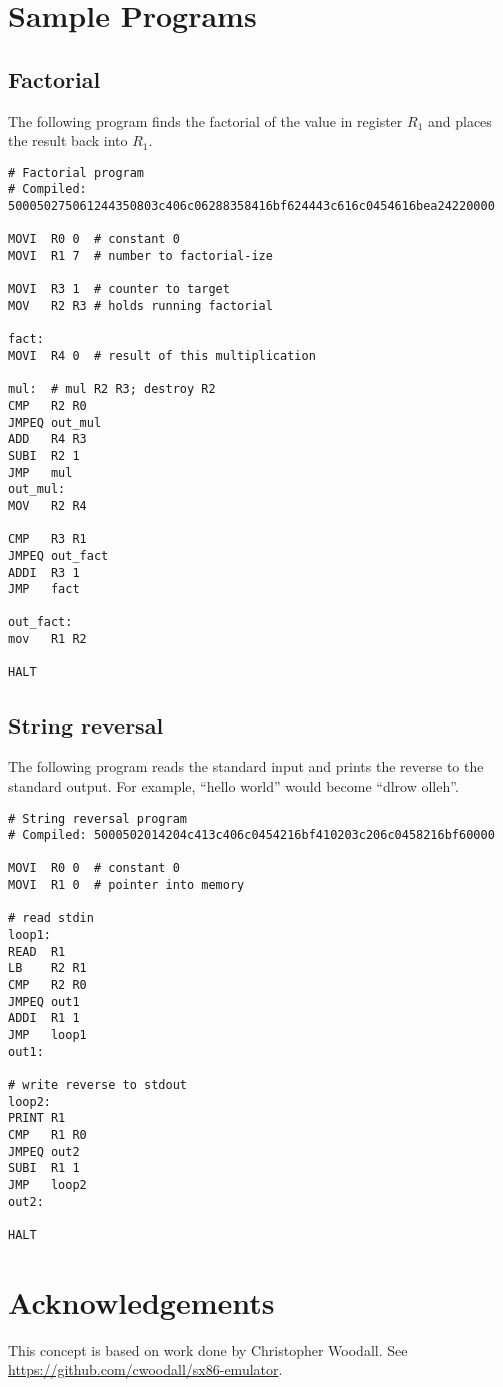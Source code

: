 \documentclass[12pt]{scrartcl}
\begin{document}
\section{Sample Programs}
\subsection{Factorial}
The following program finds the factorial of the value in register $R_1$ and places the result back into $R_1$.

\begin{lstlisting}
# Factorial program
# Compiled: 500050275061244350803c406c06288358416bf624443c616c0454616bea24220000

MOVI  R0 0  # constant 0
MOVI  R1 7  # number to factorial-ize

MOVI  R3 1  # counter to target
MOV   R2 R3 # holds running factorial

fact:
MOVI  R4 0  # result of this multiplication

mul:  # mul R2 R3; destroy R2
CMP   R2 R0
JMPEQ out_mul
ADD   R4 R3
SUBI  R2 1
JMP   mul
out_mul:
MOV   R2 R4

CMP   R3 R1
JMPEQ out_fact
ADDI  R3 1
JMP   fact

out_fact:
mov   R1 R2

HALT	
\end{lstlisting}

\subsection{String reversal}
The following program reads the standard input and prints the reverse to the standard output. For example, ``hello world'' would become ``dlrow olleh''.

\begin{lstlisting}
# String reversal program
# Compiled: 5000502014204c413c406c0454216bf410203c206c0458216bf60000

MOVI  R0 0  # constant 0
MOVI  R1 0  # pointer into memory

# read stdin
loop1:
READ  R1
LB    R2 R1
CMP   R2 R0
JMPEQ out1
ADDI  R1 1
JMP   loop1
out1:

# write reverse to stdout
loop2:
PRINT R1
CMP   R1 R0
JMPEQ out2
SUBI  R1 1
JMP   loop2
out2:

HALT	
\end{lstlisting}




\section{Acknowledgements}

This concept is based on work done by Christopher Woodall. See \url{https://github.com/cwoodall/sx86-emulator}.
\end{document}
